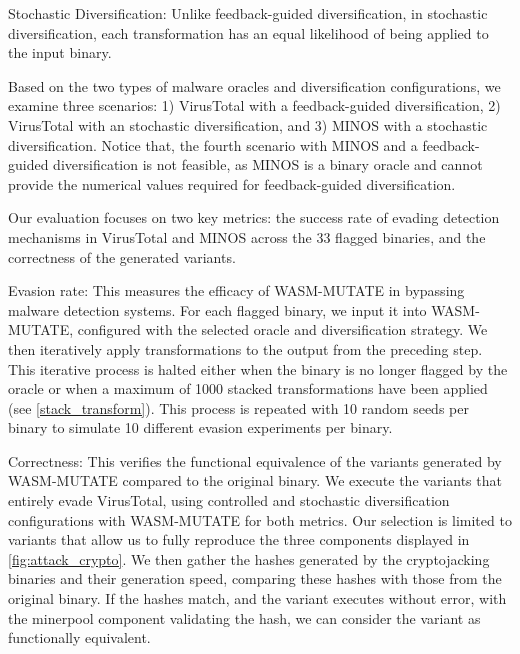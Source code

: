 \begin{definition}{Stochastic Diversification:}
    \label{uncontrolled_def}
    Unlike feedback-guided diversification, in stochastic diversification, each transformation has an equal likelihood of being applied to the input \Wasm binary.
\end{definition}


Based on the two types of malware oracles and diversification configurations, we examine three scenarios:
1) VirusTotal with a feedback-guided diversification, 2) VirusTotal with an stochastic diversification, and 3) MINOS with a stochastic diversification.
Notice that, the fourth scenario with MINOS and a feedback-guided diversification is not feasible, as MINOS is a binary oracle and cannot provide the numerical values required for feedback-guided diversification.

Our evaluation focuses on two key metrics: the success rate of evading detection mechanisms in VirusTotal and MINOS across the 33 flagged binaries, and the correctness of the generated variants.

\begin{definition}{Evasion rate:} This measures the efficacy of WASM-MUTATE in bypassing malware detection systems. 
    For each flagged binary, we input it into WASM-MUTATE, configured with the selected oracle and diversification strategy. 
    We then iteratively apply transformations to the output from the preceding step. 
    This iterative process is halted either when the binary is no longer flagged by the oracle or when a maximum of 1000 stacked transformations have been applied (see \autoref{stack_transform}).
    This process is repeated with 10 random seeds per binary to simulate 10 different evasion experiments per binary.
\end{definition}

\begin{definition}{Correctness:} This verifies the functional equivalence of the variants generated by WASM-MUTATE compared to the original binary. 
    We execute the variants that entirely evade VirusTotal, using controlled and stochastic diversification configurations with WASM-MUTATE for both metrics. 
    Our selection is limited to variants that allow us to fully reproduce the three components displayed in \autoref{fig:attack_crypto}. 
    We then gather the hashes generated by the cryptojacking binaries and their generation speed, comparing these hashes with those from the original binary. 
    If the hashes match, and the variant executes without error, with the minerpool component validating the hash, we can consider the variant as functionally equivalent.
\end{definition}

